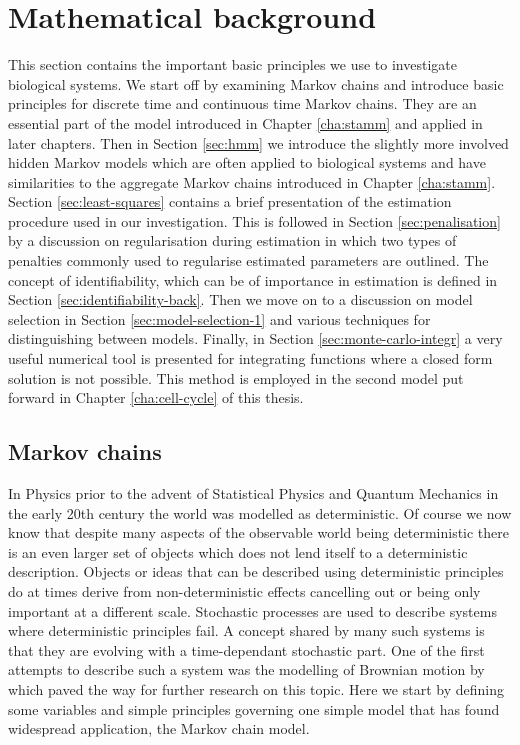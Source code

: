 
\section{Mathematical background}
\label{sec:math-backgr}

This section contains the important basic principles we use to investigate biological systems. We start off by examining Markov chains and introduce basic principles for discrete time and continuous time Markov chains. They  are an essential part of the model introduced in Chapter \ref{cha:stamm} and applied in later chapters. Then in Section \ref{sec:hmm} we introduce the slightly more involved hidden Markov models which are often applied to biological systems and have similarities to the aggregate Markov chains introduced in Chapter \ref{cha:stamm}. Section \ref{sec:least-squares} contains a brief presentation of the estimation procedure used in our investigation. This is followed in Section \ref{sec:penalisation} by a discussion on regularisation during estimation in which two types of penalties commonly used to regularise estimated parameters are outlined. The concept of identifiability, which can be of importance in estimation is defined in Section \ref{sec:identifiability-back}. Then we move on to a discussion on model selection in Section \ref{sec:model-selection-1} and various techniques for distinguishing between models. Finally, in Section \ref{sec:monte-carlo-integr} a very useful numerical tool is presented for integrating functions where a closed form solution is not possible. This method is employed in the second model put forward in Chapter \ref{cha:cell-cycle} of this thesis.

\subsection{Markov chains}
\label{sec:markov-chains}

In Physics prior to the advent of Statistical Physics and Quantum Mechanics in the early 20th century the world was modelled as deterministic. Of course we now know that despite many aspects of the observable world being deterministic there is an even larger set of objects which does not lend itself to a deterministic description. Objects or ideas that can be described using deterministic principles do at times derive from non-deterministic effects cancelling out or being only important at a different scale. Stochastic processes are used to describe systems where deterministic principles fail. A concept shared by many such systems is that they are evolving with a time-dependant stochastic part. One of the first attempts to describe such a system was the modelling of Brownian motion by \cite{Einstein:2005ww} which paved the way for further research on this topic. Here we start by defining some variables and simple principles governing one simple model that has found widespread application, the Markov chain model.

